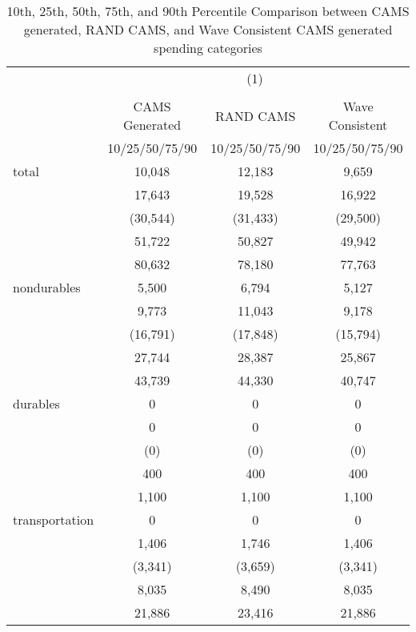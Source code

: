 \begin{table}[htbp]\centering
\def\sym#1{\ifmmode^{#1}\else\(^{#1}\)\fi}
\caption{10th, 25th, 50th, 75th, and 90th Percentile Comparison between CAMS generated, RAND CAMS, and Wave Consistent CAMS generated spending categories }
\begin{tabular}{l*{3}{c}}
\hline\hline
            &\multicolumn{3}{c}{(1)}               \\
            &\multicolumn{3}{c}{}                  \\
            &CAMS Generated&   RAND CAMS&Wave Consistent\\
            &10/25/50/75/90&10/25/50/75/90&10/25/50/75/90\\
\hline
total       &      10,048&      12,183&       9,659\\
            &      17,643&      19,528&      16,922\\
            &    (30,544)&    (31,433)&    (29,500)\\
            &      51,722&      50,827&      49,942\\
            &      80,632&      78,180&      77,763\\
[1em]
nondurables &       5,500&       6,794&       5,127\\
            &       9,773&      11,043&       9,178\\
            &    (16,791)&    (17,848)&    (15,794)\\
            &      27,744&      28,387&      25,867\\
            &      43,739&      44,330&      40,747\\
[1em]
durables    &           0&           0&           0\\
            &           0&           0&           0\\
            &         (0)&         (0)&         (0)\\
            &         400&         400&         400\\
            &       1,100&       1,100&       1,100\\
[1em]
transportation&           0&           0&           0\\
            &       1,406&       1,746&       1,406\\
            &     (3,341)&     (3,659)&     (3,341)\\
            &       8,035&       8,490&       8,035\\
            &      21,886&      23,416&      21,886\\

\end{tabular}
\end{table}
